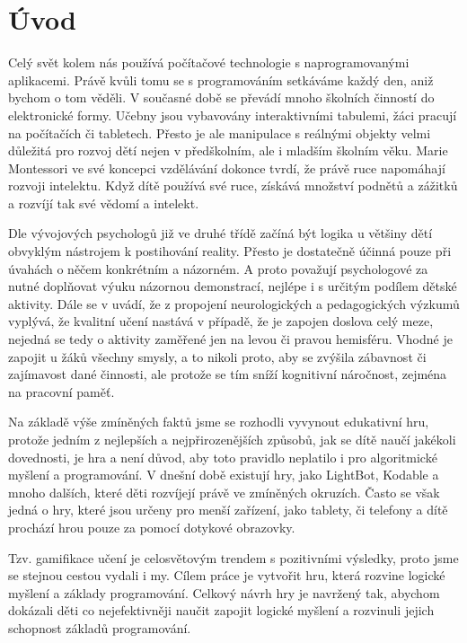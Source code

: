 \chapter{Úvod}

Celý svět kolem nás používá počítačové technologie s naprogramovanými aplikacemi. Právě kvůli tomu se s programováním setkáváme každý den, aniž bychom o tom věděli. V současné době se převádí mnoho školních činností do elektronické formy. Učebny jsou vybavovány interaktivními tabulemi, žáci pracují na počítačích či tabletech. Přesto je ale manipulace s reálnými objekty velmi důležitá pro rozvoj dětí nejen v předškolním, ale i mladším školním věku. Marie Montessori ve své koncepci vzdělávání dokonce tvrdí, že právě ruce napomáhají rozvoji intelektu. Když dítě používá své ruce, získává množství podnětů a zážitků a rozvíjí tak své vědomí a intelekt.\cite{Montessori}
\par
Dle vývojových psychologů\cite{VyvojovaPsychologie} již ve druhé třídě začíná být logika u většiny dětí obvyklým nástrojem k postihování reality. Přesto je dostatečně účinná pouze při úvahách o něčem konkrétním a názorném. A proto považují psychologové za nutné doplňovat výuku názornou demonstrací, nejlépe i s určitým podílem dětské aktivity. Dále se v \cite{ASE} uvádí, že z propojení neurologických a pedagogických výzkumů vyplývá, že kvalitní učení nastává v případě, že je zapojen doslova celý meze, nejedná se tedy o aktivity zaměřené jen na levou či pravou hemisféru. Vhodné je zapojit u žáků všechny smysly, a to nikoli proto, aby se zvýšila zábavnost či zajímavost dané činnosti, ale protože se tím sníží kognitivní náročnost, zejména na pracovní paměť.
\par
Na základě výše zmíněných faktů jsme se rozhodli vyvynout edukativní hru, protože jedním z nejlepších a nejpřirozenějších způsobů, jak se dítě naučí jakékoli dovednosti, je hra a není důvod, aby toto pravidlo neplatilo i pro algoritmické myšlení a programování. V dnešní době existují hry, jako LightBot, Kodable a mnoho dalších, které děti rozvíjejí právě ve zmíněných okruzích. Často se však jedná o hry, které jsou určeny pro menší zařízení, jako tablety, či telefony a dítě prochází hrou pouze za pomocí dotykové obrazovky.
\par
Tzv. gamifikace učení je celosvětovým trendem s pozitivními výsledky, proto jsme se stejnou cestou vydali i my. Cílem práce je vytvořit hru, která rozvine logické myšlení a základy programování. Celkový návrh hry je navržený tak, abychom dokázali děti co nejefektivněji naučit zapojit logické myšlení a rozvinuli jejich schopnost základů programování.